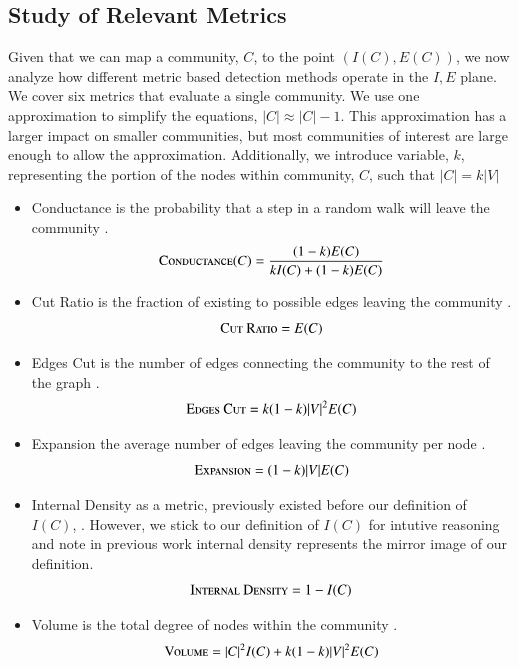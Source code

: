 \documentclass[phd,tocprelim]{cornell}
\begin{document}
\subsection{Study of Relevant Metrics}

Given that we can map a community, $C$, to the point $(I(C), E(C))$, we now analyze how different metric based detection methods operate in the $I,E$ plane.  We cover six metrics that evaluate a single community.  We use one approximation to simplify the equations, $|C| \approx |C| - 1$.  This approximation has a larger impact on smaller communities, but most communities of interest are large enough to allow the approximation.  Additionally, we introduce variable, $k$, representing the portion of the nodes within community, $C$, such that $|C| = k |V|$
\begin{itemize}
\item {\sc Conductance} is the probability that a step in a random walk will leave the community \cite{JTODO}.
\begin{equation}
\mbox{\sc Conductance}(C) = \frac{(1 - k)E(C)}{kI(C) + (1 - k)E(C)}
\end{equation}
\item {\sc Cut Ratio} is the fraction of existing to possible edges leaving the community \cite{JTODO}.
\begin{equation}
\mbox{\sc Cut Ratio} = E(C)
\end{equation}
\item {\sc Edges Cut} is the number of edges connecting the community to the rest of the graph \cite{JTODO}.\begin{equation}
\mbox{\sc Edges Cut} = k (1-k) |V|^2 E(C)
\end{equation}
\item {\sc Expansion} the average number of edges leaving the community per node \cite{JTODO}.
\begin{equation}
\mbox{\sc Expansion} = (1 - k)|V |E(C)
\end{equation}
\item {\sc Internal Density} as a metric, previously existed before our definition of $I(C)$, \cite{JTODO}.  However, we stick to our definition of $I(C)$ for intutive reasoning and note in previous work internal density represents the mirror image of our definition.
\begin{equation}
\mbox{\sc Internal Density} = 1 - I(C)
\end{equation}
\item {\sc Volume} is the total degree of nodes within the community \cite{JTODO}.
\begin{equation}
\mbox{\sc Volume} = |C|^2 I(C) + k(1-k)|V|^2E(C)
\end{equation}
\end{itemize}
\end{document}
